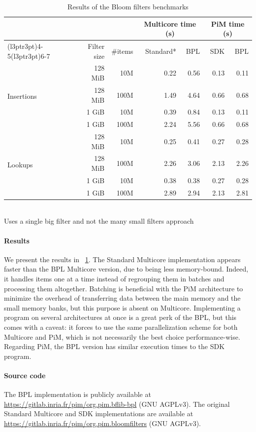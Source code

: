 \begin{table}[htbp]
    \centering
    \caption{Results of the Bloom filters benchmarks}
    \label{tab:bflib-results}
    \begin{tabular}{lrrrrrr}
    \toprule
     & & & \multicolumn{2}{c}{Multicore time (s)} & \multicolumn{2}{c}{PiM time (s)} \\
    \cmidrule(l{3pt}r{3pt}){4-5}\cmidrule(l{3pt}r{3pt}){6-7}
    & Filter size & \#items & Standard* & BPL & SDK & BPL \\
    \midrule
    \multirow{4}{*}{Insertions} & 128 MiB & 10M & 0.22 & 0.56 & 0.13 & 0.11 \\
    & 128 MiB & 100M & 1.49 & 4.64 & 0.66 & 0.68 \\
    & 1 GiB & 10M & 0.39 & 0.84 & 0.13 & 0.11 \\
    & 1 GiB & 100M & 2.24 & 5.56 & 0.66 & 0.68 \\
    \midrule
    \multirow{4}{*}{Lookups} & 128 MiB & 10M & 0.25 & 0.41 & 0.27 & 0.28 \\
    & 128 MiB & 100M & 2.26 & 3.06 & 2.13 & 2.26 \\
    & 1 GiB & 10M & 0.38 & 0.38 & 0.27 & 0.28 \\
    & 1 GiB & 100M & 2.89 & 2.94 & 2.13 & 2.81 \\
    \bottomrule
    \end{tabular}
    \\ \vspace{0.3em}
    {\scriptsize *Uses a single big filter and not the many small filters approach}
\end{table}

\paragraph{Results} We present the results in \tablename~\ref{tab:bflib-results}.
The Standard Multicore implementation appears faster than the BPL Multicore version, due to being less memory-bound.
Indeed, it handles items one at a time instead of regrouping them in batches and processing them altogether.
Batching is beneficial with the PiM architecture to minimize the overhead of transferring data between the main memory and the small memory banks, but this purpose is absent on Multicore.
Implementing a program on several architectures at once is a great perk of the BPL, but this comes with a caveat: it forces to use the same parallelization scheme for both Multicore and PiM, which is not necessarily the best choice performance-wise.
Regarding PiM, the BPL version has similar execution times to the SDK program.

\paragraph{Source code} The BPL implementation is publicly available at \url{https://gitlab.inria.fr/pim/org.pim.bflib-bpl} (GNU AGPLv3).
The original Standard Multicore and SDK implementations are available at \url{https://gitlab.inria.fr/pim/org.pim.bloomfilters} (GNU AGPLv3).